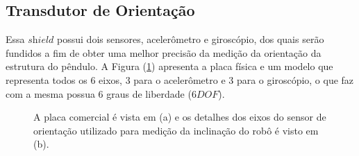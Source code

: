 \subsection{Transdutor de Orientação}

Essa $\textit{shield}$ possui dois sensores, acelerômetro e giroscópio, dos quais serão fundidos a fim de obter uma melhor precisão da medição da orientação da estrutura do pêndulo. A Figura (\ref{fig:MPU6050}) apresenta a placa física e um modelo que representa todos os 6 eixos, 3 para o acelerômetro e 3 para o giroscópio, o que faz com a mesma possua 6 graus de liberdade ($\textit{6DOF}$). 
\begin{figure}[H]
    \centering
    \caption{A placa comercial é vista em (a) e os detalhes dos eixos do sensor de orientação utilizado para medição da inclinação do robô é visto em (b).}
    \label{fig:MPU6050}
\end{figure}


